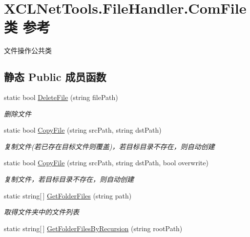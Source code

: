 \hypertarget{class_x_c_l_net_tools_1_1_file_handler_1_1_com_file}{}\section{X\+C\+L\+Net\+Tools.\+File\+Handler.\+Com\+File类 参考}
\label{class_x_c_l_net_tools_1_1_file_handler_1_1_com_file}


文件操作公共类  


\subsection*{静态 Public 成员函数}
\begin{DoxyCompactItemize}
\item 
static bool \hyperlink{class_x_c_l_net_tools_1_1_file_handler_1_1_com_file_a7cc80f663aa1e69cf43af4a902243cc3}{Delete\+File} (string file\+Path)
\begin{DoxyCompactList}\small\item\em 删除文件 \end{DoxyCompactList}\item 
static bool \hyperlink{class_x_c_l_net_tools_1_1_file_handler_1_1_com_file_ae8479a1330655aa229ed6222410b7823}{Copy\+File} (string src\+Path, string dst\+Path)
\begin{DoxyCompactList}\small\item\em 复制文件(若已存在目标文件则覆盖)，若目标目录不存在，则自动创建 \end{DoxyCompactList}\item 
static bool \hyperlink{class_x_c_l_net_tools_1_1_file_handler_1_1_com_file_a1e917318b8b594c94d0fb50223f34648}{Copy\+File} (string src\+Path, string dst\+Path, bool overwrite)
\begin{DoxyCompactList}\small\item\em 复制文件，若目标目录不存在，则自动创建 \end{DoxyCompactList}\item 
static string\mbox{[}$\,$\mbox{]} \hyperlink{class_x_c_l_net_tools_1_1_file_handler_1_1_com_file_ae82ff285ff8d522f3d6096c26e70ce40}{Get\+Folder\+Files} (string path)
\begin{DoxyCompactList}\small\item\em 取得文件夹中的文件列表 \end{DoxyCompactList}\item 
static string\mbox{[}$\,$\mbox{]} \hyperlink{class_x_c_l_net_tools_1_1_file_handler_1_1_com_file_a674fdbb6dfba9453918df90642428caf}{Get\+Folder\+Files\+By\+Recursion} (string root\+Path)

\end{DoxyCompactItemize}
